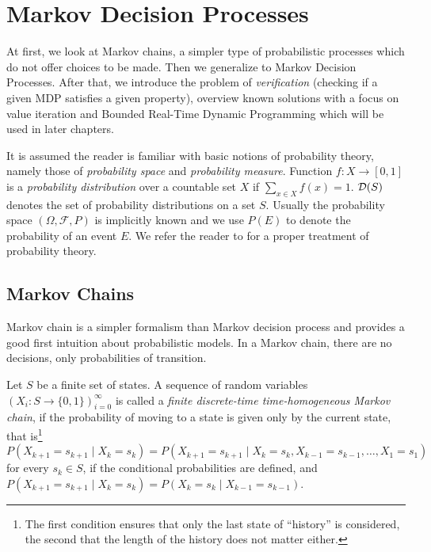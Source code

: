 \chapter{Markov Decision Processes}
\label{ch_mdp}

At first, we look at Markov chains, a simpler type of
probabilistic processes which do not offer choices to be made.
Then we generalize to Markov Decision Processes.
After that, we introduce the problem of {\em verification} (checking if a
given MDP satisfies a given property), overview known solutions with
a focus on value iteration and Bounded
Real-Time Dynamic Programming which will be used in later chapters.

It is assumed the reader is familiar with basic notions of probability
theory, namely those of {\em probability space} and {\em probability measure}.
Function $f : X \to [0,1]$ is a {\em probability distribution} over
a countable set $X$ if $\sum_{x \in X} f(x) = 1$.
$\mathcal{D}(S)$ denotes the
set of probability distributions on a set $S$.
Usually the probability space $(\Omega, \mathcal{F}, P)$
is implicitly known and we use $P(E)$ to
denote the probability of an event $E$.
We refer the reader to
\parencite{probability} for a proper treatment of probability theory.

\section{Markov Chains}

Markov chain is a simpler formalism than
Markov decision process and provides a good first intuition about
probabilistic models. In a Markov chain, there are no decisions, only
probabilities of transition.

\begin{definition}
    Let $S$ be a finite set of states.
    A sequence of random variables $(X_i : S \to \{0,1\})^{\infty}_{i=0}$
    is called a {\em finite discrete-time time-homogeneous Markov chain},
    if the probability of moving to a state is given only by the
    current state, that is\footnote{The first condition ensures that
    only the last state of ``history'' is considered, the second that
    the length of the history does not matter either.}
    $P(X_{k+1} = s_{k+1} \mid X_k = s_k) =
    P(X_{k+1} = s_{k+1} \mid X_k = s_k, X_{k-1} = s_{k-1}, \ldots, X_{1} = s_{1})$
    for every $s_k \in S$,
    if the conditional probabilities are defined,
    and
    $P(X_{k+1} = s_{k+1} \mid X_k = s_k)
    = P(X_{k} = s_{k} \mid X_{k-1} = s_{k-1})$.
\end{definition}

